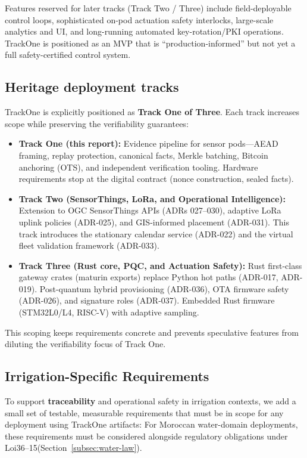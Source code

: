 Features reserved for later tracks (Track Two / Three) include field-deployable control loops, sophisticated on-pod actuation safety interlocks, large-scale analytics and UI, and long-running automated key-rotation/\ac{PKI} operations.
TrackOne is positioned as an \ac{MVP} that is ``production-informed'' but not yet a full safety-certified control system.

\subsection{Heritage deployment tracks}\label{subsec:heritage-deployment-tracks}
TrackOne is explicitly positioned as \textbf{Track One of Three}.
Each track increases scope while preserving the verifiability guarantees:
\begin{itemize}[nosep]
  \item \textbf{Track One (this report):} Evidence pipeline for sensor pods---\ac{AEAD} framing, replay protection, canonical facts, Merkle batching, Bitcoin anchoring (\ac{OTS}), and independent verification tooling.
  Hardware requirements stop at the digital contract (nonce construction, sealed facts).
  \item \textbf{Track Two (SensorThings, LoRa, and Operational Intelligence):} Extension to \ac{OGC} SensorThings \ac{API}s (\ac{ADR}s 027--030), adaptive \ac{LoRa} uplink policies (\ac{ADR}-025), and \ac{GIS}-informed placement (\ac{ADR}-031).
  This track introduces the stationary calendar service (\ac{ADR}-022) and the virtual fleet validation framework (\ac{ADR}-033).
  \item \textbf{Track Three (Rust core, PQC, and Actuation Safety):} Rust first-class gateway crates (maturin exports) replace Python hot paths (\ac{ADR}-017, \ac{ADR}-019).
  Post-quantum hybrid provisioning (\ac{ADR}-036), OTA firmware safety (\ac{ADR}-026), and signature roles (\ac{ADR}-037).
  Embedded Rust firmware (STM32L0/L4, RISC-V) with adaptive sampling.
\end{itemize}
This scoping keeps requirements concrete and prevents speculative features from diluting the verifiability focus of Track One.

\subsection{Irrigation-Specific Requirements}\label{subsec:irrigation-specific-requirements}
To support \textbf{traceability} and operational safety in irrigation contexts, we add a small set of testable, measurable requirements that must be in scope for any deployment using TrackOne artifacts:
For Moroccan water-domain deployments, these requirements must be considered alongside regulatory obligations under Loi36--15(Section~\ref{subsec:water-law}).

